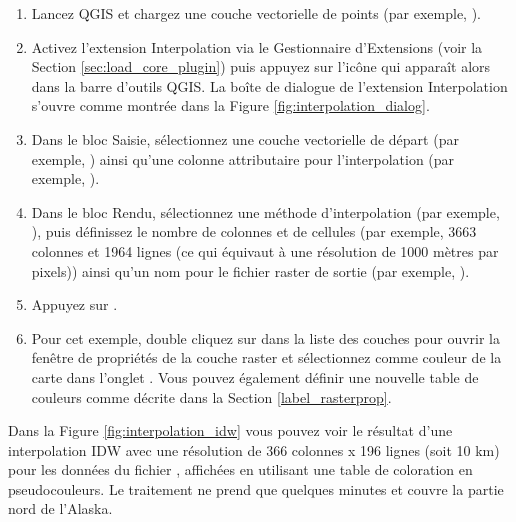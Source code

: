 \begin{enumerate}
  \item Lancez QGIS et chargez une couche vectorielle de points (par 
  exemple, ). 
  \item Activez l'extension Interpolation via le Gestionnaire d'Extensions 
  (voir la Section \ref{sec:load_core_plugin}) puis appuyez sur l'icône
   qui apparaît alors dans la barre 
  d'outils QGIS. La boîte de dialogue de l'extension Interpolation s'ouvre 
  comme montrée dans la Figure \ref{fig:interpolation_dialog}.
  \item Dans le bloc Saisie, sélectionnez une couche vectorielle de départ 
  (par exemple, ) ainsi qu'une colonne 
  attributaire pour l'interpolation (par exemple, ).
  \item Dans le bloc Rendu, sélectionnez une méthode d'interpolation 
  (par exemple, ), puis 
  définissez le nombre de colonnes et de cellules (par exemple, 3663 colonnes 
  et 1964 lignes (ce qui équivaut à une résolution de 1000 mètres par 
  pixels)) ainsi qu'un nom pour le fichier raster de sortie
  (par exemple, ).
  \item Appuyez sur .
  \item Pour cet exemple, double cliquez sur  dans la
  liste des couches pour ouvrir la fenêtre de propriétés de la couche raster 
  et sélectionnez  comme couleur de la 
  carte dans l'onglet . Vous pouvez également définir une 
  nouvelle table de couleurs comme décrite dans la Section \ref{label_rasterprop}.
\end{enumerate}

Dans la Figure \ref{fig:interpolation_idw} vous pouvez voir le résultat d'une
interpolation IDW avec une résolution de 366 colonnes x 196 lignes (soit 
10 km) pour les données du fichier , affichées en utilisant 
une table de coloration en pseudocouleurs. Le traitement ne prend que quelques 
minutes et couvre la partie nord de l'Alaska.

